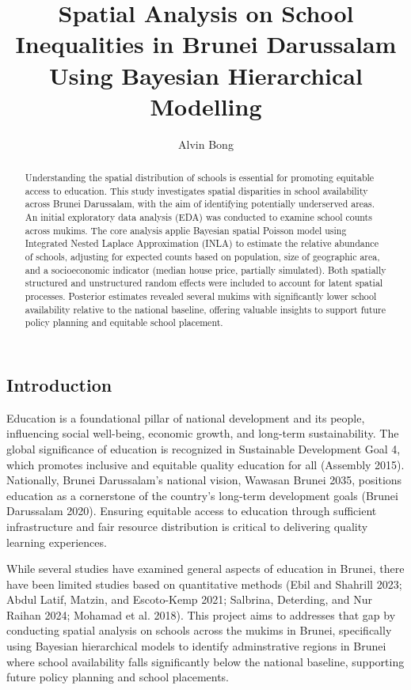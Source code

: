 \documentclass[
  12pt,
]{article}
\title{Spatial Analysis on School Inequalities in Brunei Darussalam
Using Bayesian Hierarchical Modelling}
\author{Alvin Bong}
\date{}
\begin{document}
\maketitle
\begin{abstract}
Understanding the spatial distribution of schools is essential for
promoting equitable access to education. This study investigates spatial
disparities in school availability across Brunei Darussalam, with the
aim of identifying potentially underserved areas. An initial exploratory
data analysis (EDA) was conducted to examine school counts across
mukims. The core analysis applie Bayesian spatial Poisson model using
Integrated Nested Laplace Approximation (INLA) to estimate the relative
abundance of schools, adjusting for expected counts based on population,
size of geographic area, and a socioeconomic indicator (median house
price, partially simulated). Both spatially structured and unstructured
random effects were included to account for latent spatial processes.
Posterior estimates revealed several mukims with significantly lower
school availability relative to the national baseline, offering valuable
insights to support future policy planning and equitable school
placement.
\end{abstract}


\subsection{Introduction}\label{introduction}

Education is a foundational pillar of national development and its
people, influencing social well-being, economic growth, and long-term
sustainability. The global significance of education is recognized in
Sustainable Development Goal 4, which promotes inclusive and equitable
quality education for all (Assembly 2015). Nationally, Brunei
Darussalam's national vision, Wawasan Brunei 2035, positions education
as a cornerstone of the country's long-term development goals (Brunei
Darussalam 2020). Ensuring equitable access to education through
sufficient infrastructure and fair resource distribution is critical to
delivering quality learning experiences.

While several studies have examined general aspects of education in
Brunei, there have been limited studies based on quantitative methods
(Ebil and Shahrill 2023; Abdul Latif, Matzin, and Escoto-Kemp 2021;
Salbrina, Deterding, and Nur Raihan 2024; Mohamad et al. 2018). This
project aims to addresses that gap by conducting spatial analysis on
schools across the mukims in Brunei, specifically using Bayesian
hierarchical models to identify adminstrative regions in Brunei where
school availability falls significantly below the national baseline,
supporting future policy planning and school placements.
\end{document}
